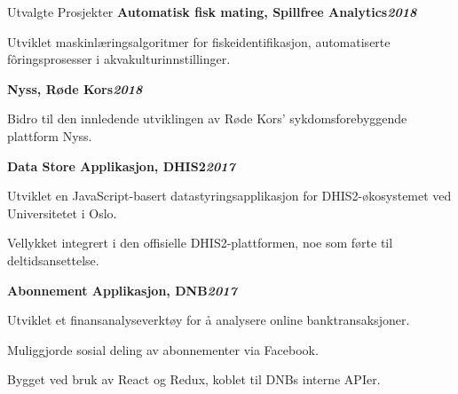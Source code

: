 \begin{rubric}{Utvalgte Prosjekter}
%
\entry*[]%
\textbf{Automatisk fisk mating, Spillfree Analytics\hfill\textit{2018}} \par
    \begin{compactitem}
    \item Utviklet maskinlæringsalgoritmer for fiskeidentifikasjon, automatiserte fôringsprosesser i akvakulturinnstillinger.
    \vspace{-12pt}
\end{compactitem}
%
\entry*[]%
\textbf{Nyss, Røde Kors\hfill\textit{2018}} \par
    \begin{compactitem}
    \item Bidro til den innledende utviklingen av Røde Kors' sykdomsforebyggende plattform Nyss.
    \vspace{-12pt}
\end{compactitem}
%
\entry*[]%
\textbf{Data Store Applikasjon, DHIS2\hfill\textit{2017}} \par
\begin{compactitem}
    \item Utviklet en JavaScript-basert datastyringsapplikasjon for DHIS2-økosystemet ved Universitetet i Oslo.
    \item Vellykket integrert i den offisielle DHIS2-plattformen, noe som førte til deltidsansettelse.
    \vspace{-12pt}
\end{compactitem}
%
\entry*[]%
\textbf{Abonnement Applikasjon, DNB\hfill\textit{2017}} \par
\begin{compactitem}
    \item Utviklet et finansanalyseverktøy for å analysere online banktransaksjoner.
    \item Muliggjorde sosial deling av abonnementer via Facebook.
    \item Bygget ved bruk av React og Redux, koblet til DNBs interne APIer.
    \vspace{-12pt}
\end{compactitem}
%
\end{rubric}
